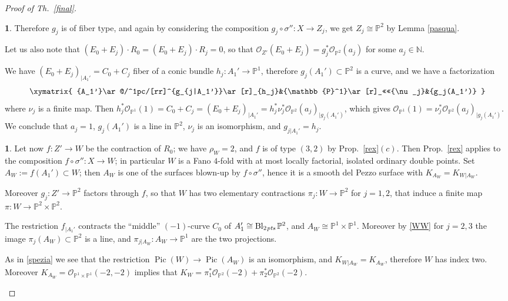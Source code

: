 \documentclass[a4paper,12pt]{amsart}
\theoremstyle{definition}
\newtheorem{prg}[thm]{}
\numberwithin{figure}{section}
\numberwithin{table}{section}
\newcommand{\ol}{\mathcal{O}}
\newcommand{\pr}{\mathbb{P}}
\newcommand{\Pic}{\operatorname{Pic}}
\newcommand{\Bl}{\operatorname{Bl}}
\newcommand{\pts}{\text{\it pts}}
\begin{document}
\begin{proof}[Proof of Th.~\ref{final}]
\begin{prg}
Therefore $g_j$ is of fiber type, and again
  by considering the composition $g_j\circ\sigma''\colon X\to Z_j$, we get $Z_j\cong\pr^2$ by Lemma \ref{pasqua}.

Let us also note that $(E_0+E_j)\cdot R_0=(E_0+E_j)\cdot R_j=0$, so that $\ol_{Z'}(E_0+E_j)=g_j^*\ol_{\pr^2}(a_j)$ for some $a_j\in\mathbb{N}$.

We have $(E_0+E_j)_{|A_1'}=C_0+C_j$ fiber of a conic bundle $h_j\colon A_1'\to\pr^1$, therefore
$g_j(A_1')\subset \pr^2$ is a curve, and we have a factorization
 $$\xymatrix{ {A_1'}\ar@/^1pc/[rr]^{g_{j|A_1'}}\ar[r]_{h_j}&{\pr^1}\ar[r]_<<<<{\nu_j}&{g_j(A_1')}
 }$$
 where $\nu_j$ is a finite map. Then $h_j^*\ol_{\pr^1}(1)=C_0+C_j=(E_0+E_j)_{|A_1'}=h_j^*\nu_j^*\ol_{\pr^2}(a_j)_{|g_j(A_1')}$, which gives
$\ol_{\pr^1}(1)=\nu_j^*\ol_{\pr^2}(a_j)_{|g_j(A_1')}$.
We conclude that $a_j=1$, $g_j(A_1')$ is a line in $\pr^2$,
 $\nu_j$ is an isomorphism, and $g_{j|A_1'}=h_j$.
  \end{prg}
\begin{prg}\label{malpensa}
  Let now
  $f\colon Z'\to W$ be the contraction of $R_0$; we have $\rho_W=2$, and $f$ is of type $(3,2)$ by Prop.~\ref{rex}$(c)$. Then 
Prop.~\ref{rex} applies to
  the composition
  $f\circ \sigma''\colon X\to W$; in particular $W$ is a Fano $4$-fold with at most locally factorial, isolated ordinary double points.
Set $A_W:=f(A_1')\subset W$; then $A_W$ is one of the surfaces blown-up by 
$f\circ\sigma''$, hence it is a smooth del Pezzo surface with $K_{A_W}=K_{W|A_W}$.

Moreover $g_j\colon Z'\to\pr^2$ factors through $f$, so that  
 $W$ has two elementary contractions 
 $\pi_j\colon W\to\pr^2$ for $j=1,2$, that induce a finite map $\pi\colon W\to\pr^2\times\pr^2$.

 The restriction $f_{|A_1'}$ contracts the ``middle'' $(-1)$-curve $C_0$ of $A_1'\cong\Bl_{2\mskip1mu\pts}\pr^2$, and $A_W\cong 
\pr^1\times\pr^1$. Moreover by \ref{WW} for $j=2,3$ the image $\pi_j(A_W)\subset\pr^2$ is a line, and $\pi_{j|A_W}\colon A_W\to\pr^1$ are the two projections.

As in \ref{spezia} we see that
 the restriction $\Pic(W)\to\Pic(A_W)$ is an isomorphism, and $K_{W|A_W}=K_{A_W}$, therefore $W$ has index two. Moreover  $K_{A_W}=\ol_{\pr^1\times\pr^1}(-2,-2)$ implies that $K_W=\pi_1^*\ol_{\pr^2}(-2)+
 \pi_2^*\ol_{\pr^2}(-2)$.
 

\end{prg}
\end{proof}
\end{document}
